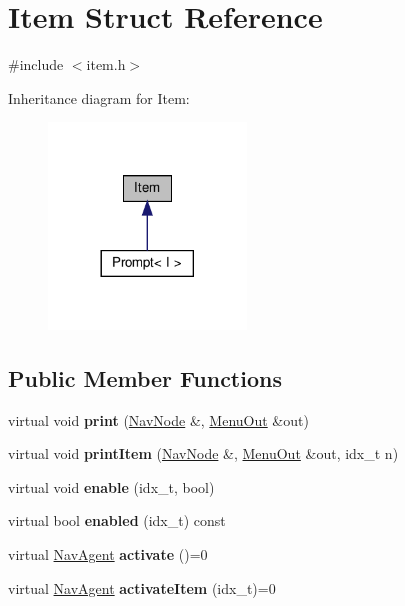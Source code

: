 \hypertarget{structItem}{}\section{Item Struct Reference}
\label{structItem}


{\ttfamily \#include $<$item.\+h$>$}



Inheritance diagram for Item\+:\nopagebreak
\begin{figure}[H]
\begin{center}
\leavevmode
\includegraphics[width=149pt]{structItem__inherit__graph}
\end{center}
\end{figure}
\subsection*{Public Member Functions}
\begin{DoxyCompactItemize}
\item 
\mbox{\label{structItem_a48e23000fb91838772b9c9bebbd78497}} 
virtual void {\bfseries print} (\hyperlink{structNavNode}{Nav\+Node} \&, \hyperlink{structMenuOut}{Menu\+Out} \&out)
\item 
\mbox{\label{structItem_a6efc4b4278477e89420279d4cfc480b3}} 
virtual void {\bfseries print\+Item} (\hyperlink{structNavNode}{Nav\+Node} \&, \hyperlink{structMenuOut}{Menu\+Out} \&out, idx\+\_\+t n)
\item 
\mbox{\label{structItem_a8f540c337986f0ad492f6916c0ed9983}} 
virtual void {\bfseries enable} (idx\+\_\+t, bool)
\item 
\mbox{\label{structItem_abccd7d2f634cb3c01bdd5941da28d7fc}} 
virtual bool {\bfseries enabled} (idx\+\_\+t) const
\item 
\mbox{\label{structItem_af9c0c1cc12e9750b7b228800655bf09b}} 
virtual \hyperlink{structNavAgent}{Nav\+Agent} {\bfseries activate} ()=0
\item 
\mbox{\label{structItem_a83ac9af5b8c3943e8ce6f71a5d3ac0b6}} 
virtual \hyperlink{structNavAgent}{Nav\+Agent} {\bfseries activate\+Item} (idx\+\_\+t)=0
\end{DoxyCompactItemize}


